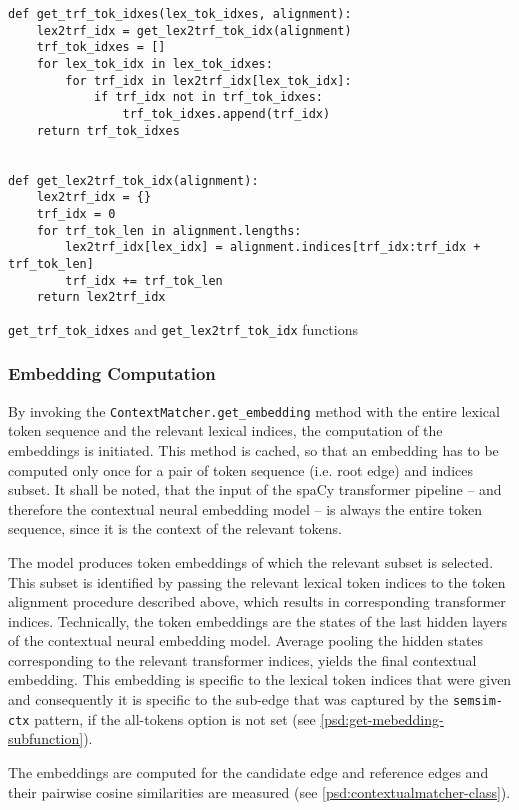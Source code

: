 \documentclass[11pt, numbers=noenddot]{scrreprt}
\begin{document}
\begin{pseudo}[htp]
\begin{lstlisting}
def get_trf_tok_idxes(lex_tok_idxes, alignment):
    lex2trf_idx = get_lex2trf_tok_idx(alignment)
    trf_tok_idxes = []
    for lex_tok_idx in lex_tok_idxes:
        for trf_idx in lex2trf_idx[lex_tok_idx]:
            if trf_idx not in trf_tok_idxes:
                trf_tok_idxes.append(trf_idx)
    return trf_tok_idxes


def get_lex2trf_tok_idx(alignment):
    lex2trf_idx = {}
    trf_idx = 0
    for trf_tok_len in alignment.lengths:
        lex2trf_idx[lex_idx] = alignment.indices[trf_idx:trf_idx + trf_tok_len]
        trf_idx += trf_tok_len
    return lex2trf_idx
\end{lstlisting}
\caption{\texttt{get\_trf\_tok\_idxes} and \texttt{get\_lex2trf\_tok\_idx} functions}
\label{psd:token-alignment-subfunctions}
\end{pseudo}


\subsubsection{Embedding Computation}
By invoking the \texttt{ContextMatcher.get\_embedding} method with the entire lexical token sequence and the relevant lexical indices, the computation of the embeddings is initiated. This method is cached, so that an embedding has to be computed only once for a pair of token sequence (i.e. root edge) and indices subset.
It shall be noted, that the input of the spaCy transformer pipeline -- and therefore the contextual neural embedding model -- is always the entire token sequence, since it is the context of the relevant tokens. 

The model produces token embeddings of which the relevant subset is selected. This subset is identified by passing the relevant lexical token indices to the token alignment procedure described above, which results in corresponding transformer indices. Technically, the token embeddings are the states of the last hidden layers of the contextual neural embedding model. Average pooling the hidden states corresponding to the relevant transformer indices, yields the final contextual embedding. This  embedding is specific to the lexical token indices that were given and consequently it is specific to the sub-edge that was captured by the \texttt{semsim-ctx} pattern, if the all-tokens option is not set (see \cref{psd:get-mebedding-subfunction}).


The embeddings are computed for the candidate edge and reference edges and their pairwise cosine similarities are measured (see \cref{psd:contextualmatcher-class}).
\end{document}
